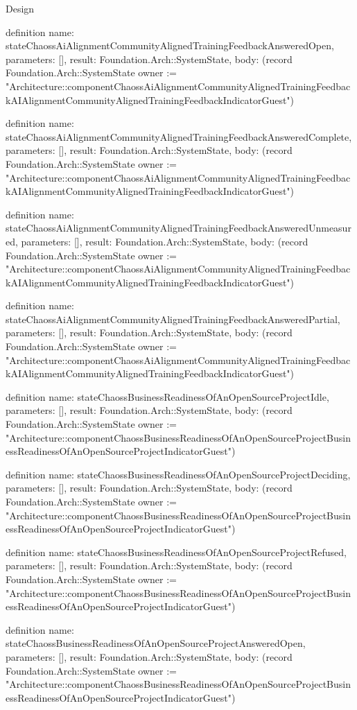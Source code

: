 \begin{lexlean}{Design}
\begin{semanticmodule}
definition{
  name: stateChaossAiAlignmentCommunityAlignedTrainingFeedbackAnsweredOpen,
  parameters: [],
  result: Foundation.Arch::SystemState,
  body: (record Foundation.Arch::SystemState {owner := "Architecture::componentChaossAiAlignmentCommunityAlignedTrainingFeedbackAIAlignmentCommunityAlignedTrainingFeedbackIndicatorGuest"})
}

definition{
  name: stateChaossAiAlignmentCommunityAlignedTrainingFeedbackAnsweredComplete,
  parameters: [],
  result: Foundation.Arch::SystemState,
  body: (record Foundation.Arch::SystemState {owner := "Architecture::componentChaossAiAlignmentCommunityAlignedTrainingFeedbackAIAlignmentCommunityAlignedTrainingFeedbackIndicatorGuest"})
}

definition{
  name: stateChaossAiAlignmentCommunityAlignedTrainingFeedbackAnsweredUnmeasured,
  parameters: [],
  result: Foundation.Arch::SystemState,
  body: (record Foundation.Arch::SystemState {owner := "Architecture::componentChaossAiAlignmentCommunityAlignedTrainingFeedbackAIAlignmentCommunityAlignedTrainingFeedbackIndicatorGuest"})
}

definition{
  name: stateChaossAiAlignmentCommunityAlignedTrainingFeedbackAnsweredPartial,
  parameters: [],
  result: Foundation.Arch::SystemState,
  body: (record Foundation.Arch::SystemState {owner := "Architecture::componentChaossAiAlignmentCommunityAlignedTrainingFeedbackAIAlignmentCommunityAlignedTrainingFeedbackIndicatorGuest"})
}

definition{
  name: stateChaossBusinessReadinessOfAnOpenSourceProjectIdle,
  parameters: [],
  result: Foundation.Arch::SystemState,
  body: (record Foundation.Arch::SystemState {owner := "Architecture::componentChaossBusinessReadinessOfAnOpenSourceProjectBusinessReadinessOfAnOpenSourceProjectIndicatorGuest"})
}

definition{
  name: stateChaossBusinessReadinessOfAnOpenSourceProjectDeciding,
  parameters: [],
  result: Foundation.Arch::SystemState,
  body: (record Foundation.Arch::SystemState {owner := "Architecture::componentChaossBusinessReadinessOfAnOpenSourceProjectBusinessReadinessOfAnOpenSourceProjectIndicatorGuest"})
}

definition{
  name: stateChaossBusinessReadinessOfAnOpenSourceProjectRefused,
  parameters: [],
  result: Foundation.Arch::SystemState,
  body: (record Foundation.Arch::SystemState {owner := "Architecture::componentChaossBusinessReadinessOfAnOpenSourceProjectBusinessReadinessOfAnOpenSourceProjectIndicatorGuest"})
}

definition{
  name: stateChaossBusinessReadinessOfAnOpenSourceProjectAnsweredOpen,
  parameters: [],
  result: Foundation.Arch::SystemState,
  body: (record Foundation.Arch::SystemState {owner := "Architecture::componentChaossBusinessReadinessOfAnOpenSourceProjectBusinessReadinessOfAnOpenSourceProjectIndicatorGuest"})
}


\end{semanticmodule}
\end{lexlean}
